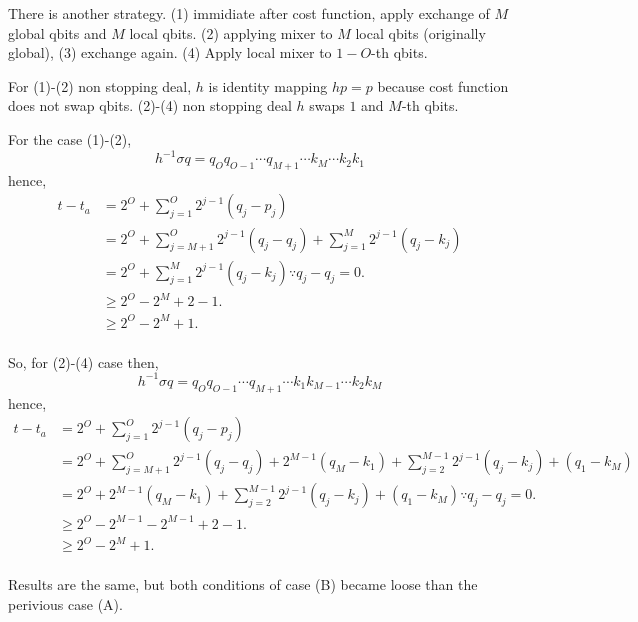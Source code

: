 \documentclass[a4paper]{article}
\begin{document}
There is another strategy. (1) immidiate after cost function, apply exchange of \(M\) global qbits and \(M\) local qbits. (2) applying mixer to \(M\) local qbits (originally global), (3) exchange again. (4) Apply local mixer to \(1-O\)-th qbits.

For (1)-(2) non stopping deal, \(h\) is identity mapping \(hp=p\) because cost function does not swap qbits. (2)-(4) non stopping deal \(h\) swaps \(1\) and \(M\)-th qbits. 

For the case (1)-(2), 
\[
h^{-1}\sigma q  = q_O q_{O-1}\cdots q_{M+1} \cdots k_M \cdots k_2 k_1
\]
hence, 
\begin{align*}
 t - t_a &= 2^O + \sum_{j=1}^{O} 2^{j-1}(q_j-p_j) \\
 &= 2^O + \sum_{j=M+1}^{O} 2^{j-1}(q_j-q_j)  + \sum_{j=1}^{M} 2^{j-1}(q_j-k_j) \\
 &= 2^O + \sum_{j=1}^{M} 2^{j-1}(q_j-k_j) \because q_j-q_j = 0.\\
 &\geq 2^O - 2^{M} + 2 - 1.\\
 &\geq 2^O - 2^{M} + 1.\\
\end{align*}

So, for (2)-(4) case then,
\[
h^{-1}\sigma q  = q_O q_{O-1}\cdots q_{M+1} \cdots k_1 k_{M-1}\cdots k_2 k_M
\]
hence, 
\begin{align*}
 t - t_a &= 2^O + \sum_{j=1}^{O} 2^{j-1}(q_j-p_j) \\
 &= 2^O + \sum_{j=M+1}^{O} 2^{j-1}(q_j-q_j)  + 2^{M-1}(q_M-k_1) + \sum_{j=2}^{M-1} 2^{j-1}(q_j-k_j) + (q_1-k_M)\\
 &= 2^O  + 2^{M-1}(q_M-k_1) + \sum_{j=2}^{M-1} 2^{j-1}(q_j-k_j) + (q_1-k_M)\because q_j - q_j = 0.\\
 &\geq 2^O - 2^{M-1} - 2^{M-1} + 2 - 1.\\
 &\geq 2^O - 2^{M} + 1.\\
\end{align*}

Results are the same, but both conditions of case (B) became loose than the perivious case (A). 
\end{document}
